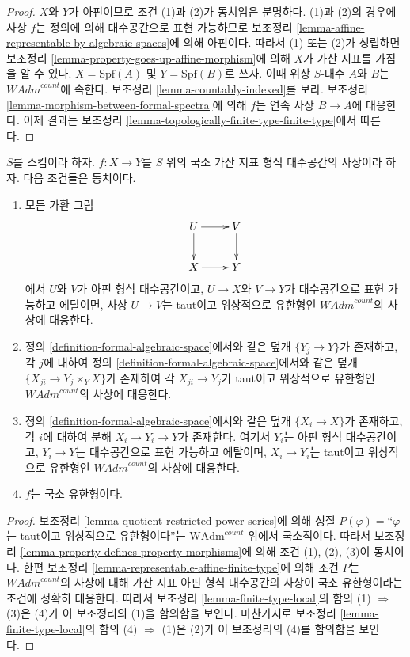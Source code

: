 \begin{proof}
$X$와 $Y$가 아핀이므로 조건 (1)과 (2)가 동치임은 분명하다.
(1)과 (2)의 경우에 사상 $f$는 정의에 의해 대수공간으로 표현
가능하므로 보조정리 \ref{lemma-affine-representable-by-algebraic-spaces}에
의해 아핀이다. 따라서 (1) 또는 (2)가 성립하면 보조정리
\ref{lemma-property-goes-up-affine-morphism}에 의해 $X$가 가산 지표를
가짐을 알 수 있다. $X = \text{Spf}(A)$ 및 $Y = \text{Spf}(B)$로
쓰자. 이때 위상 $S$-대수 $A$와 $B$는 $\textit{WAdm}^{count}$에 속한다. 보조정리
\ref{lemma-countably-indexed}를 보라. 보조정리
\ref{lemma-morphism-between-formal-spectra}에 의해 $f$는 연속 사상
$B \to A$에 대응한다. 이제 결과는 보조정리
\ref{lemma-topologically-finite-type-finite-type}에서 따른다.
\end{proof}

\begin{lemma}
\label{lemma-finite-type-local-property}
$S$를 스킴이라 하자. $f : X \to Y$를 $S$ 위의 국소 가산 지표
형식 대수공간의 사상이라 하자. 다음 조건들은 동치이다.
\begin{enumerate}
\item 모든 가환 그림
$$
\xymatrix{
U \ar[d] \ar[r] & V \ar[d] \\
X \ar[r] & Y
}
$$
에서 $U$와 $V$가 아핀 형식 대수공간이고, $U \to X$와 $V \to Y$가
대수공간으로 표현 가능하고 에탈이면, 사상 $U \to V$는 taut이고
위상적으로 유한형인 $\textit{WAdm}^{count}$의 사상에 대응한다.
\item 정의 \ref{definition-formal-algebraic-space}에서와 같은 덮개
$\{Y_j \to Y\}$가 존재하고, 각 $j$에 대하여 정의
\ref{definition-formal-algebraic-space}에서와 같은 덮개
$\{X_{ji} \to Y_j \times_Y X\}$가 존재하여 각
$X_{ji} \to Y_j$가 taut이고 위상적으로 유한형인
$\textit{WAdm}^{count}$의 사상에 대응한다.
\item 정의 \ref{definition-formal-algebraic-space}에서와 같은 덮개
$\{X_i \to X\}$가 존재하고, 각 $i$에 대하여 분해
$X_i \to Y_i \to Y$가 존재한다. 여기서 $Y_i$는 아핀 형식
대수공간이고, $Y_i \to Y$는 대수공간으로 표현 가능하고 에탈이며,
$X_i \to Y_i$는 taut이고 위상적으로 유한형인
$\textit{WAdm}^{count}$의 사상에 대응한다. %
\item $f$는 국소 유한형이다.
\end{enumerate}
\end{lemma}

\begin{proof}
보조정리 \ref{lemma-quotient-restricted-power-series}에 의해 성질
$P(\varphi)=$``$\varphi$는 taut이고 위상적으로 유한형이다''는
$\text{WAdm}^{count}$ 위에서 국소적이다. 따라서 보조정리
\ref{lemma-property-defines-property-morphisms}에 의해 조건 (1), (2),
(3)이 동치이다. 한편 보조정리
\ref{lemma-representable-affine-finite-type}에 의해
조건 $P$는 $\textit{WAdm}^{count}$의 사상에 대해 가산 지표 아핀
형식 대수공간의 사상이 국소 유한형이라는 조건에 정확히 대응한다.
따라서 보조정리 \ref{lemma-finite-type-local}의 함의
(1) $\Rightarrow$ (3)은 (4)가 이 보조정리의 (1)을 함의함을 보인다.
마찬가지로 보조정리 \ref{lemma-finite-type-local}의 함의
(4) $\Rightarrow$ (1)은 (2)가 이 보조정리의 (4)를 함의함을 보인다.
\end{proof}

